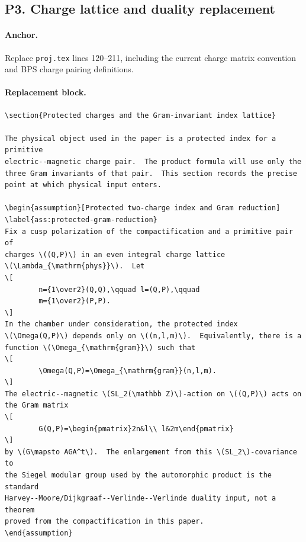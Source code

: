 \subsection{P3. Charge lattice and duality replacement}

\paragraph{Anchor.}
Replace \texttt{proj.tex} lines 120--211, including the current charge
matrix convention and BPS charge pairing definitions.

\paragraph{Replacement block.}
\begin{verbatim}
\section{Protected charges and the Gram-invariant index lattice}

The physical object used in the paper is a protected index for a primitive
electric--magnetic charge pair.  The product formula will use only the
three Gram invariants of that pair.  This section records the precise
point at which physical input enters.

\begin{assumption}[Protected two-charge index and Gram reduction]
\label{ass:protected-gram-reduction}
Fix a cusp polarization of the compactification and a primitive pair of
charges \((Q,P)\) in an even integral charge lattice
\(\Lambda_{\mathrm{phys}}\).  Let
\[
        n={1\over2}(Q,Q),\qquad l=(Q,P),\qquad
        m={1\over2}(P,P).
\]
In the chamber under consideration, the protected index
\(\Omega(Q,P)\) depends only on \((n,l,m)\).  Equivalently, there is a
function \(\Omega_{\mathrm{gram}}\) such that
\[
        \Omega(Q,P)=\Omega_{\mathrm{gram}}(n,l,m).
\]
The electric--magnetic \(SL_2(\mathbb Z)\)-action on \((Q,P)\) acts on
the Gram matrix
\[
        G(Q,P)=\begin{pmatrix}2n&l\\ l&2m\end{pmatrix}
\]
by \(G\mapsto AGA^t\).  The enlargement from this \(SL_2\)-covariance to
the Siegel modular group used by the automorphic product is the standard
Harvey--Moore/Dijkgraaf--Verlinde--Verlinde duality input, not a theorem
proved from the compactification in this paper.
\end{assumption}


\end{verbatim}
